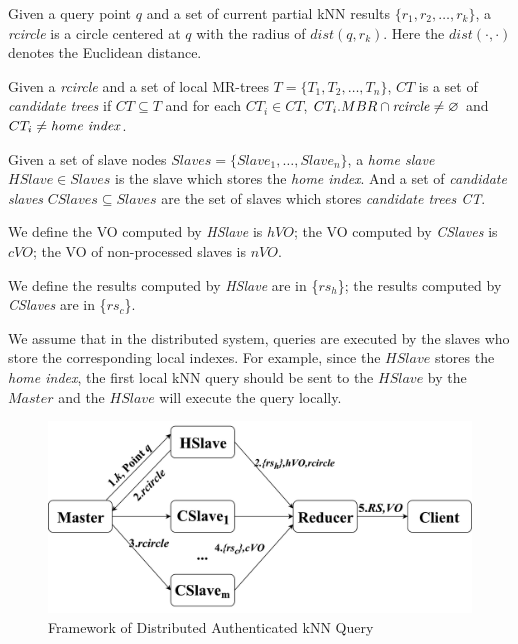 \begin{definition}\label{def:knn:def2}
  Given a query point $q$ and a set of current partial kNN results $\{r_{1}, r_{2}, \dots, r_{k}\}$, a \emph{rcircle} is a circle centered at $q$ with the radius of $dist(q,r_{k})$. Here the $dist(\cdot,\cdot)$ denotes the Euclidean distance.
\end{definition}

\begin{definition}\label{def:knn:def3}
  Given a \emph{rcircle} and a set of local MR-trees $T = \{T_{1}, T_{2}, \dots, T_{n}\}$, $CT$ is a set of \emph{candidate trees} if $CT \subseteq T$ and for each $CT_{i} \in CT$, $CT_{i}.MBR \cap \text{\emph{rcircle}} \neq \emptyset$ and $CT_{i} \neq \text{\emph{home index}}$.
\end{definition}

\begin{definition}\label{def:knn:def4}
  Given a set of slave nodes $Slaves = \{Slave_{1}, \dots, Slave_{n}\}$, a \emph{home slave} $HSlave \in Slaves$ is the slave which stores the \emph{home index}. And a set of \emph{candidate slaves} $CSlaves\subseteq Slaves$ are the set of slaves which stores \emph{candidate trees CT}.
\end{definition}

\begin{definition}\label{def:knn:def5}
  We define the VO computed by \emph{HSlave} is $hVO$; the VO computed by \emph{CSlaves} is $cVO$; the VO of non-processed slaves is $nVO$.
\end{definition}

\begin{definition}\label{def:knn:def6}
  We define the results computed by \emph{HSlave} are in \{$rs_{h}$\}; the results computed by \emph{CSlaves} are in \{$rs_{c}$\}.
\end{definition}

We assume that in the distributed system, queries are executed by the slaves who store the corresponding local indexes. For example, since the $HSlave$ stores the \emph{home index}, the first local kNN query should be sent to the $HSlave$ by the $Master$ and the $HSlave$ will execute the query locally.

\begin{figure}[t]
  \centering
  \includegraphics[width=.7\linewidth]{figs/knn/framework.pdf}
  \caption{Framework of Distributed Authenticated kNN Query}\label{fig:knn:frame}
\end{figure}


